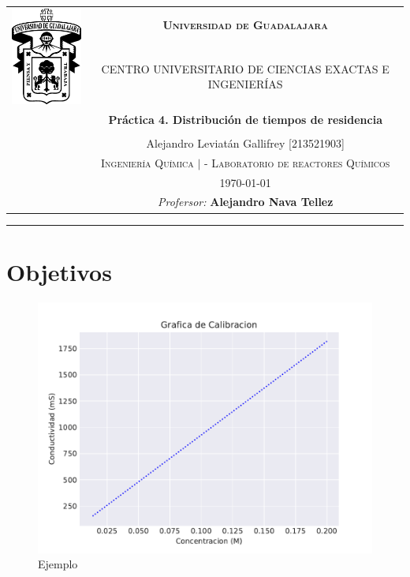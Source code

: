 \documentclass[12pt,letterpaper]{article}
\begin{document}
\renewcommand{\tablename}{Tabla}
\thispagestyle{empty}
\sloppy     %
\begin{center}
  \begin{tabular}{cc}

\multirow{2}{3.5cm}{\includegraphics[width=3cm]{Figuras/udgn.eps}}	& \huge{\textsc{\textbf{Universidad de Guadalajara}}}\\
 & \scriptsize{\textsc{CENTRO UNIVERSITARIO DE CIENCIAS EXACTAS E INGENIERÍAS}}\\[5mm]
 & \Large{\textsf{\textbf{Práctica 4. Distribución de tiempos de residencia
}}}\\
 & \\ \vspace{5mm}
 & \small{\textsf{Alejandro Leviatán Gallifrey  [213521903]}}\\
 & \small{\textsc{Ingeniería Química $|$  - Laboratorio de reactores Químicos}}\\
 & \today\\
 & \small{\textit{Profersor:}}  \textbf{\small{Alejandro Nava Tellez }}\\
  \end{tabular}
\end{center}


\rule{\linewidth}{0.75mm}

\tableofcontents
\section{Objetivos}

\begin{figure}[H]
	\centering
	\includegraphics[scale=1]{Figuras/Curva_Calibracion.pdf}
	\caption{Ejemplo}
	\label{fig:Curva_calibracion}
	
\end{figure}
\end{document}
